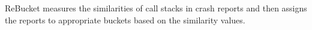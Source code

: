ReBucket measures the similarities of call stacks in crash reports and then assigns the reports to appropriate buckets based on the similarity values.\cite{dang2012rebucket}